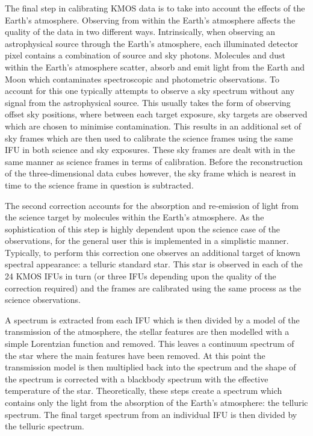 

The final step in calibrating KMOS data is to take into account the effects of the Earth's atmosphere.
Observing from within the Earth's atmosphere affects the quality of the data in two different ways.
Intrinsically, when observing an astrophysical source through the Earth's atmosphere, each illuminated detector pixel contains a combination of source and sky photons.
Molecules and dust within the Earth's atmosphere scatter, absorb and emit light from the Earth and Moon which contaminates spectroscopic and photometric observations.
To account for this one typically attempts to observe a sky spectrum without any signal from the astrophysical source.
This usually takes the form of observing offset sky positions, where between each target exposure, sky targets are observed which are chosen to minimise contamination.
This results in an additional set of sky frames which are then used to calibrate the science frames using the same IFU in both science and sky exposures.
These sky frames are dealt with in the same manner as science frames in terms of calibration.
Before the reconstruction of the three-dimensional data cubes however, the sky frame which is nearest in time to the science frame in question is subtracted.

The second correction accounts for the absorption and re-emission of light from the science target by molecules within the Earth's atmosphere.
As the sophistication of this step is highly dependent upon the science case of the observations, for the general user this is implemented in a simplistic manner.
Typically, to perform this correction one observes an additional target of known spectral appearance: a telluric standard star.
This star is observed in each of the 24 KMOS IFUs in turn (or three IFUs depending upon the quality of the correction required) and the frames are calibrated using the same process as the science observations.

A spectrum is extracted from each IFU which is then divided by a model of the transmission of the atmosphere, the stellar features are then modelled with a simple Lorentzian function and removed.
This leaves a continuum spectrum of the star where the main features have been removed.
At this point the transmission model is then multiplied back into the spectrum and the shape of the spectrum is corrected with a blackbody spectrum with the effective temperature of the star.
Theoretically, these steps create a spectrum which contains only the light from the absorption of the Earth's atmosphere: the telluric spectrum.
The final target spectrum from an individual IFU is then divided by the telluric spectrum.

